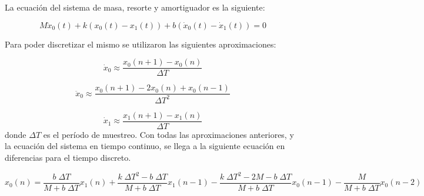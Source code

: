 La ecuación del sistema de masa, resorte y amortiguador es la siguiente:

\begin{equation*}
	M \ddot{x}_{0}(t) + k (x_{0}(t) - x_{1}(t)) + b (\dot{x}_{0}(t) - \dot{x}_{1}(t)) = 0
\end{equation*}

Para poder discretizar el mismo se utilizaron las siguientes aproximaciones:

\begin{equation*}
	\dot{x}_{0} \approx \frac{x_{0}(n + 1) - x_{0}(n)}{\Delta T}
\end{equation*}

\begin{equation*}
	\ddot{x}_{0} \approx \frac{x_{0}(n + 1) - 2 x_{0}(n) + x_{0}(n - 1)}{\Delta T^2}
\end{equation*}

\begin{equation*}
	\dot{x}_{1} \approx \frac{x_{1}(n + 1) - x_{1}(n)}{\Delta T}
\end{equation*}
donde $\Delta T$ es el período de muestreo. Con todas las aproximaciones anteriores, y la ecuación del sistema en tiempo continuo, se llega a la siguiente ecuación en diferencias para el tiempo discreto.

\begin{equation*}
	x_{0}(n) = \frac{b \;\Delta T}{M + b \;\Delta T} x_{1}(n) + \frac{k \;\Delta T^2 - b \;\Delta T}{M + b \;\Delta T} x_{1}(n - 1) - \frac{k \;\Delta T^2 - 2 M - b \;\Delta T}{M + b \;\Delta T} x_{0}(n - 1) - \frac{M}{M + b \;\Delta T} x_{0}(n - 2)
\end{equation*}


